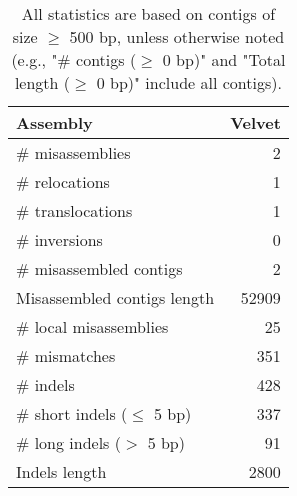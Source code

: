 \documentclass[12pt,a4paper]{article}
\begin{document}
\begin{table}[ht]
\begin{center}
\caption{All statistics are based on contigs of size $\geq$ 500 bp, unless otherwise noted (e.g., "\# contigs ($\geq$ 0 bp)" and "Total length ($\geq$ 0 bp)" include all contigs).}
\begin{tabular}{|l*{1}{|r}|}
\hline
Assembly & Velvet \\ \hline
\# misassemblies & 2 \\ \hline
\hspace{5mm}\# relocations & 1 \\ \hline
\hspace{5mm}\# translocations & 1 \\ \hline
\hspace{5mm}\# inversions & 0 \\ \hline
\# misassembled contigs & 2 \\ \hline
Misassembled contigs length & 52909 \\ \hline
\# local misassemblies & 25 \\ \hline
\# mismatches & 351 \\ \hline
\# indels & 428 \\ \hline
\hspace{5mm}\# short indels ($\leq$ 5 bp) & 337 \\ \hline
\hspace{5mm}\# long indels ($>$ 5 bp) & 91 \\ \hline
Indels length & 2800 \\ \hline
\end{tabular}
\end{center}
\end{table}
\end{document}

